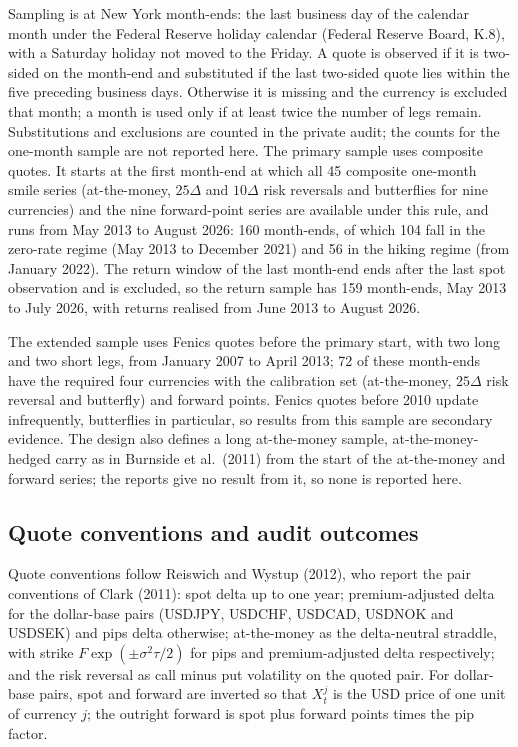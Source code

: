 \documentclass[11pt]{article}
\theoremstyle{result}
\newcommand{\D}{\Delta}
\begin{document}
Sampling is at New York month-ends: the last business day of the calendar month under the Federal Reserve holiday calendar (Federal Reserve Board, K.8), with a Saturday holiday not moved to the Friday. A quote is observed if it is two-sided on the month-end and substituted if the last two-sided quote lies within the five preceding business days. Otherwise it is missing and the currency is excluded that month; a month is used only if at least twice the number of legs remain. Substitutions and exclusions are counted in the private audit; the counts for the one-month sample are not reported here.
The primary sample uses composite quotes. It starts at the first month-end at which all 45 composite one-month smile series (at-the-money, $25\D$ and $10\D$ risk reversals and butterflies for nine currencies) and the nine forward-point series are available under this rule, and runs from May 2013 to August 2026: 160 month-ends, of which 104 fall in the zero-rate regime (May 2013 to December 2021) and 56 in the hiking regime (from January 2022). The return window of the last month-end ends after the last spot observation and is excluded, so the return sample has 159 month-ends, May 2013 to July 2026, with returns realised from June 2013 to August 2026.

The extended sample uses Fenics quotes before the primary start, with two long and two short legs, from January 2007 to April 2013; 72 of these month-ends have the required four currencies with the calibration set (at-the-money, $25\D$ risk reversal and butterfly) and forward points. Fenics quotes before 2010 update infrequently, butterflies in particular, so results from this sample are secondary evidence. The design also defines a long at-the-money sample, at-the-money-hedged carry as in Burnside et al.\ (2011) from the start of the at-the-money and forward series; the reports give no result from it, so none is reported here.

\subsection{Quote conventions and audit outcomes}

Quote conventions follow Reiswich and Wystup (2012), who report the pair conventions of Clark (2011): spot delta up to one year; premium-adjusted delta for the dollar-base pairs (USDJPY, USDCHF, USDCAD, USDNOK and USDSEK) and pips delta otherwise; at-the-money as the delta-neutral straddle, with strike $F\exp(\pm\sigma^2\tau/2)$ for pips and premium-adjusted delta respectively; and the risk reversal as call minus put volatility on the quoted pair. For dollar-base pairs, spot and forward are inverted so that $X^j_t$ is the USD price of one unit of currency $j$; the outright forward is spot plus forward points times the pip factor.
\end{document}
